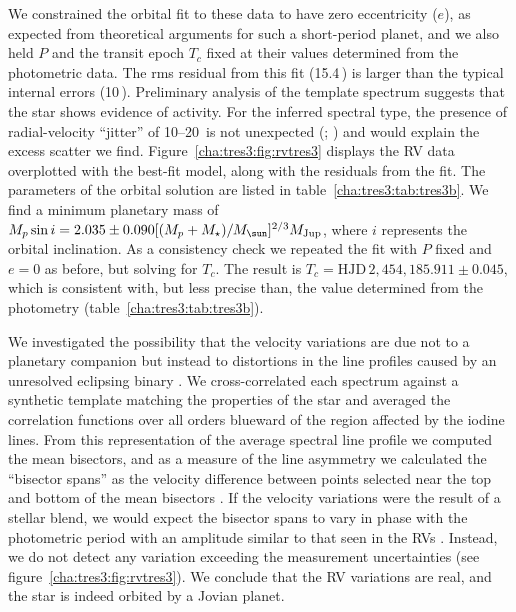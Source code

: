 We constrained the orbital fit to these data to have zero eccentricity ($e$), as expected from theoretical arguments for such a short-period planet, and we also held $P$ and the transit epoch $T_c$ fixed at their values determined from the photometric data.
The rms residual from this fit (15.4\,\ms) is larger than the typical internal errors (10\,\ms).
Preliminary analysis of the template spectrum suggests that the star shows evidence of activity.
For the inferred spectral type, the presence of radial-velocity ``jitter'' of \mbox{10--20\,\ms} is not unexpected (\citealp*{Saar_Butler_Marcy:apjl:1998a}; \citealp{Santos_Mayor_Naef:aa:2000a, Wright:pasp:2005a}) and would explain the excess scatter we find.
Figure~\ref{cha:tres3:fig:rvtres3} displays the RV data overplotted with the best-fit model, along with the residuals from the fit.
The parameters of the orbital solution are listed in table~\ref{cha:tres3:tab:tres3b}.
We find a minimum planetary mass of \mbox{$M_p \sin i = 2.035 \pm 0.090 [(M_p+M_{\star})/M_{\sun}]^{2/3} M_{\rm Jup}$}, where $i$ represents the orbital inclination.
As a consistency check we repeated the fit with $P$ fixed and $e = 0$ as before, but
solving for $T_c$.
The result is $T_c = \mathrm{HJD}\,2,\!454,\!185.911 \pm 0.045$, which is consistent with, but less precise than, the value determined from the photometry (table~\ref{cha:tres3:tab:tres3b}).

We investigated the possibility that the velocity variations are due not to a planetary companion but instead to distortions in the line profiles caused by an unresolved eclipsing binary \citep{Santos_Mayor_Naef:aa:2002a, Torres_Konacki_Sasselov:apj:2005a}.
We cross-correlated each spectrum against a synthetic template matching the properties of the star and averaged the correlation functions over all orders blueward of the region affected by the iodine lines.
From this representation of the average spectral line profile we computed the mean bisectors, and as a measure of the line asymmetry we calculated the ``bisector spans'' as the velocity difference between points selected near the top and bottom of the mean bisectors \citep{Torres_Konacki_Sasselov:apj:2005a}.
If the velocity variations were the result of a stellar blend, we would expect the bisector spans to vary in phase with the photometric period with an amplitude similar to that seen in the RVs \citep{Queloz_Henry_Sivan:aa:2001a, Mandushev_Torres_Latham:apj:2005a}.
Instead, we do not detect any variation exceeding the measurement uncertainties (see figure~\ref{cha:tres3:fig:rvtres3}).
We conclude that the RV variations are real, and the star is indeed orbited by a Jovian
planet.

